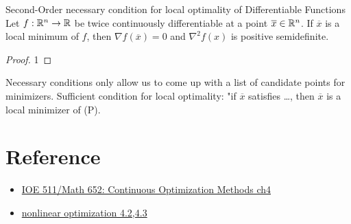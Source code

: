 \begin{theorem}{Second-Order necessary condition for local optimality of Differentiable Functions}{}
    Let $f:\mathbb{R}^n\to \mathbb{R}$ be twice continuously differentiable at a point $\overline{x}\in \mathbb{R}^n$. If $\overline{x}$ is a local minimum of $f$, 
    then $\nabla f(\overline{x})=0$ and $\nabla^2f(x)$ is positive semidefinite.
\end{theorem}

\begin{proof}
    1
\end{proof}

Necessary conditions only allow us to come up with a list of candidate points for minimizers.
Sufficient condition for local optimality: "if $\overline{x}$ satisfies \dots, then $\overline{x}$ is a local minimizer of (P).

\section{Reference}
\begin{itemize}
    \item \href{}{IOE 511/Math 652: Continuous Optimization Methods ch4}
    \item \href{https://sites.math.washington.edu/~burke/crs/408/notes/Math408_W2020/math408text.pdf}{nonlinear optimization 4.2,4.3}
\end{itemize}
